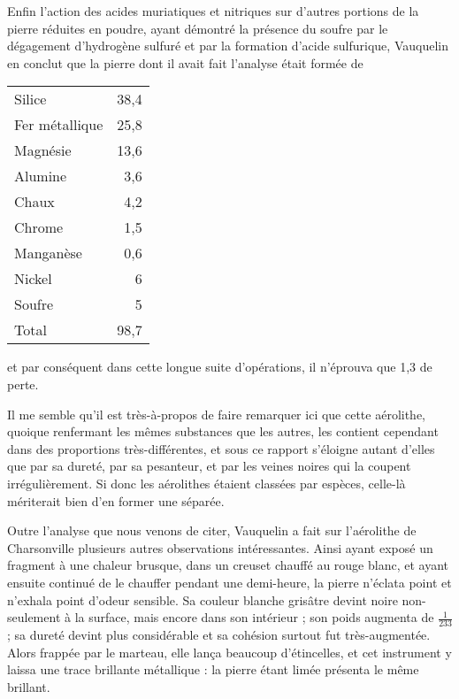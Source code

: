 \documentclass[a4paper, 12pt, oneside, french]{article}
\begin{document}
Enfin l'action des acides muriatiques et nitriques sur d'autres portions de la pierre réduites en poudre, ayant démontré la présence du soufre par le dégagement d'hydrogène sulfuré et par la formation d'acide sulfurique, Vauquelin en conclut que la pierre dont il avait fait l'analyse était formée de
\begin{table}[H]
    \centering
    \begin{tabular}{l r}
        Silice & 38,4 \\
        Fer métallique & 25,8 \\
        Magnésie & 13,6 \\
        Alumine & 3,6 \\
        Chaux & 4,2 \\
        Chrome & 1,5 \\
        Manganèse & 0,6 \\
        Nickel & 6 \\
        Soufre & 5 \\ \hline
        Total & 98,7 \\
    \end{tabular}
\end{table}
et par conséquent dans cette longue suite d'opérations, il n'éprouva que 1,3 de perte.

Il me semble qu'il est très-à-propos de faire remarquer ici que cette aérolithe, quoique renfermant les mêmes substances que les autres, les contient cependant dans des proportions très-différentes, et sous ce rapport s'éloigne autant d'elles que par sa dureté, par sa pesanteur, et par les veines noires qui la coupent irrégulièrement. Si donc les aérolithes étaient classées par espèces, celle-là mériterait bien d'en former une séparée.

Outre l'analyse que nous venons de citer, Vauquelin a fait sur l'aérolithe de Charsonville plusieurs autres observations intéressantes. Ainsi ayant exposé un fragment à une chaleur brusque, dans un creuset chauffé au rouge blanc, et ayant ensuite continué de le chauffer pendant une demi-heure, la pierre n'éclata point et n'exhala point d'odeur sensible. Sa couleur blanche grisâtre devint noire non-seulement à la surface, mais encore dans son intérieur ; son poids augmenta de $\frac{1}{233}$ ; sa dureté devint plus considérable et sa cohésion surtout fut très-augmentée. Alors frappée par le marteau, elle lança beaucoup d'étincelles, et cet instrument y laissa une trace brillante métallique : la pierre étant limée présenta le même brillant.
\end{document}
